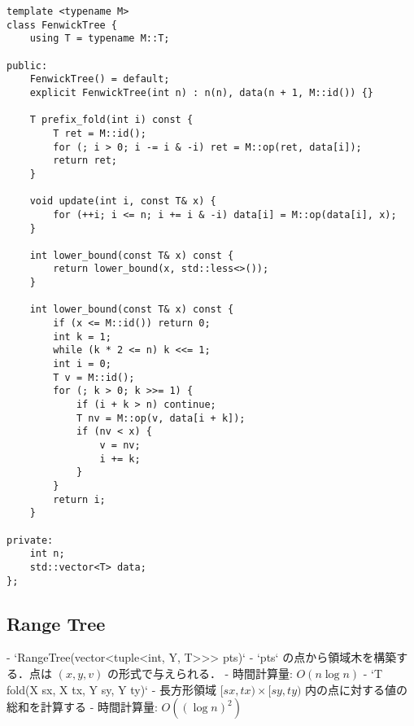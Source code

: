 \begin{lstlisting}
template <typename M>
class FenwickTree {
    using T = typename M::T;

public:
    FenwickTree() = default;
    explicit FenwickTree(int n) : n(n), data(n + 1, M::id()) {}

    T prefix_fold(int i) const {
        T ret = M::id();
        for (; i > 0; i -= i & -i) ret = M::op(ret, data[i]);
        return ret;
    }

    void update(int i, const T& x) {
        for (++i; i <= n; i += i & -i) data[i] = M::op(data[i], x);
    }

    int lower_bound(const T& x) const {
        return lower_bound(x, std::less<>());
    }

    int lower_bound(const T& x) const {
        if (x <= M::id()) return 0;
        int k = 1;
        while (k * 2 <= n) k <<= 1;
        int i = 0;
        T v = M::id();
        for (; k > 0; k >>= 1) {
            if (i + k > n) continue;
            T nv = M::op(v, data[i + k]);
            if (nv < x) {
                v = nv;
                i += k;
            }
        }
        return i;
    }

private:
    int n;
    std::vector<T> data;
};
\end{lstlisting}

\subsection{Range Tree}

\begin{small}
\begin{markdown}
- `RangeTree(vector<tuple<int, Y, T>>> pts)`
    - `pts` の点から領域木を構築する．点は $(x, y, v)$ の形式で与えられる．
    - 時間計算量: $O(n\log n)$
- `T fold(X sx, X tx, Y sy, Y ty)`
    - 長方形領域 $[sx, tx) \times [sy, ty)$ 内の点に対する値の総和を計算する
    - 時間計算量: $O((\log n)^2)$
\end{markdown}
\end{small}

